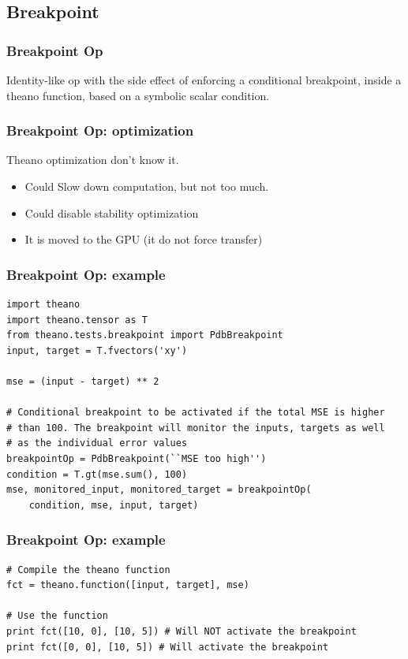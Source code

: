\documentclass[utf8x,xcolor=pdftex,dvipsnames,table]{beamer}
\begin{document}
\subsection{Breakpoint}
\begin{frame}[fragile]
  \frametitle{Breakpoint Op} Identity-like op with the side effect of
  enforcing a conditional breakpoint, inside a theano function, based
  on a symbolic scalar condition.
\end{frame}

\begin{frame}[fragile]
  \frametitle{Breakpoint Op: optimization}
  Theano optimization don't know it.
\begin{itemize}
  \item Could Slow down computation, but not too much.
  \item Could disable stability optimization
  \item It is moved to the GPU (it do not force transfer)
\end{itemize}
\end{frame}

\begin{frame}[fragile]
  \frametitle{Breakpoint Op: example}
\begin{lstlisting}
import theano
import theano.tensor as T
from theano.tests.breakpoint import PdbBreakpoint
input, target = T.fvectors('xy')

mse = (input - target) ** 2

# Conditional breakpoint to be activated if the total MSE is higher
# than 100. The breakpoint will monitor the inputs, targets as well
# as the individual error values
breakpointOp = PdbBreakpoint(``MSE too high'')
condition = T.gt(mse.sum(), 100)
mse, monitored_input, monitored_target = breakpointOp(
    condition, mse, input, target)
\end{lstlisting}
\end{frame}

\begin{frame}[fragile]
  \frametitle{Breakpoint Op: example}
\begin{lstlisting}
# Compile the theano function
fct = theano.function([input, target], mse)

# Use the function
print fct([10, 0], [10, 5]) # Will NOT activate the breakpoint
print fct([0, 0], [10, 5]) # Will activate the breakpoint
\end{lstlisting}

\end{frame}
\end{document}
